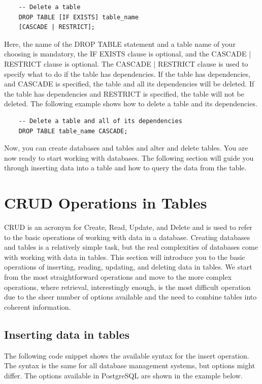\begin{verbatim}
    -- Delete a table
    DROP TABLE [IF EXISTS] table_name 
    [CASCADE | RESTRICT];
\end{verbatim}

Here, the name of the DROP TABLE statement and a table name of your choosing is mandatory, the IF EXISTS clause is optional, and the CASCADE | RESTRICT clause is optional. The CASCADE | RESTRICT clause is used to specify what to do if the table has dependencies. If the table has dependencies, and CASCADE is specified, the table and all its dependencies will be deleted. If the table has dependencies and RESTRICT is specified, the table will not be deleted. The following example shows how to delete a table and its dependencies.

\begin{verbatim}
    -- Delete a table and all of its dependencies
    DROP TABLE table_name CASCADE;
\end{verbatim}

Now, you can create databases and tables and alter and delete tables. You are now ready to start working with databases. The following section will guide you through inserting data into a table and how to query the data from the table.

\section{CRUD Operations in Tables}
CRUD is an acronym for Create, Read, Update, and Delete and is used to refer to the basic operations of working with data in a database. Creating databases and tables is a relatively simple task, but the real complexities of databases come with working with data in tables. This section will introduce you to the basic operations of inserting, reading, updating, and deleting data in tables. We start from the most straightforward operations and move to the more complex operations, where retrieval, interestingly enough, is the most difficult operation due to the sheer number of options available and the need to combine tables into coherent information.

\subsection{Inserting data in tables}
The following code snippet shows the available syntax for the insert operation. The syntax is the same for all database management systems, but options might differ. The options available in PostgreSQL are shown in the example below.


